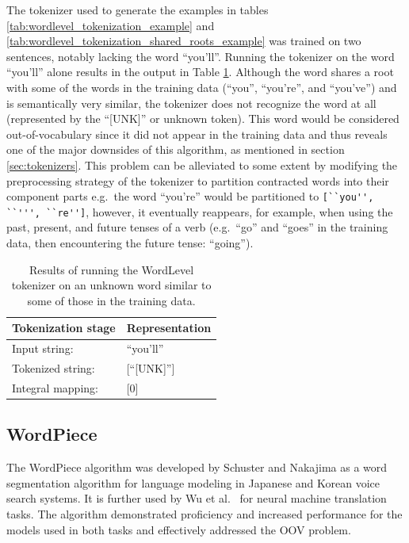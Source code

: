 \documentclass[12pt]{article}
\begin{document}
The tokenizer used to generate the examples in tables \ref{tab:wordlevel_tokenization_example} and
\ref{tab:wordlevel_tokenization_shared_roots_example} was trained on two sentences, notably lacking the word ``you'll''. Running the tokenizer on the
word ``you'll'' alone results in the output in Table \ref{tab:wordlevel_unk_word}. Although the word shares a root with some of the words in the
training data (``you'', ``you're'', and ``you've'') and is semantically very similar, the tokenizer does not recognize the word at all (represented
by the ``[UNK]'' or unknown token). This word would be considered out-of-vocabulary since it did not appear in the training data and thus reveals one
of the major downsides of this algorithm, as mentioned in section \ref{sec:tokenizers}. This problem can be alleviated to some extent by modifying the
preprocessing strategy of the tokenizer to partition contracted words into their component parts e.g.~the word ``you're'' would be partitioned to
\lstinline|[``you'', ``''', ``re'']|, however, it eventually reappears, for example, when using the past, present, and future tenses of a verb
(e.g.~``go'' and ``goes'' in the training data, then encountering the future tense: ``going'').

\begin{table}[!t]
    \centering
    \begin{tabular}{l l}
        \toprule
        Tokenization stage & Representation \\
        \midrule
        Input string:      & ``you'll''     \\
        Tokenized string:  & [``[UNK]'']    \\
        Integral mapping:  & [0]            \\
        \bottomrule
    \end{tabular}
    \caption{Results of running the WordLevel tokenizer on an unknown word similar to some of those in the training data.}
    \label{tab:wordlevel_unk_word}
\end{table}

\subsection{WordPiece}\label{sec:wordpiece}
The WordPiece algorithm was developed by Schuster and Nakajima \cite{schuster_japanese_2012} as a word segmentation algorithm for language modeling in
Japanese and Korean voice search systems. It is further used by Wu et al.~\cite{wu_googles_2016} for neural machine translation tasks. The algorithm
demonstrated proficiency and increased performance for the models used in both tasks and effectively addressed the OOV problem.
\end{document}
